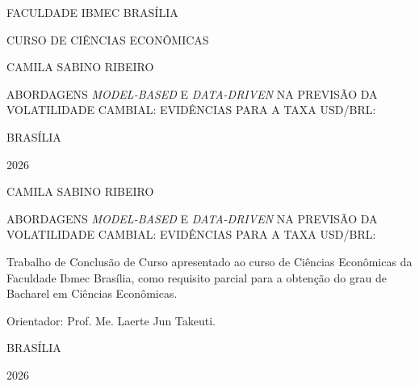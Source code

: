 \documentclass[12pt,a4paper,oneside,openany]{report}
\newcommand{\tccinstituicao}{FACULDADE IBMEC BRASÍLIA}
\newcommand{\tcccurso}{CURSO DE CIÊNCIAS ECONÔMICAS}
\newcommand{\tccautor}{CAMILA SABINO RIBEIRO}
\newcommand{\tcctitulo}{ABORDAGENS \textit{MODEL-BASED} E \textit{DATA-DRIVEN} NA PREVISÃO DA VOLATILIDADE CAMBIAL: EVIDÊNCIAS PARA A TAXA USD/BRL}
\newcommand{\tccsubtitulo}{}            %
\newcommand{\tcclocal}{BRASÍLIA}
\newcommand{\tccano}{2026}
\newcommand{\tccorientador}{Prof. Me. Laerte Jun Takeuti}
\newcommand{\tccnatureza}{Trabalho de Conclusão de Curso apresentado ao curso
de Ciências Econômicas da Faculdade Ibmec Brasília, como requisito parcial para a
obtenção do grau de Bacharel em Ciências Econômicas.}
\newcommand{\tcctitulocompleto}{\tcctitulo\ifx\tccsubtitulo\empty\else: \tccsubtitulo\fi}
\begin{document}

\begin{titlepage}
  \centering\bfseries\singlespacing
  {\tccinstituicao\par}
  \vspace{0.5\baselineskip}
  {\tcccurso\par}
  \vspace{3cm}
  {\tccautor\par}
  \vfill
  {\tcctitulocompleto\par}
  \vfill
  {\tcclocal\par}
  {\tccano\par}
\end{titlepage}

\thispagestyle{empty}
\begin{center}\bfseries\singlespacing
  {\tccautor\par}
  \vspace{4cm}
  {\tcctitulocompleto\par}
\end{center}
\vspace{2cm}
\hfill
\begin{minipage}{0.5\textwidth}
  \singlespacing\normalfont\justifying
  \noindent\tccnatureza\par
  \vspace{\baselineskip}
  \noindent Orientador: \tccorientador.
\end{minipage}
\vfill
\begin{center}\bfseries\singlespacing
  {\tcclocal\par}
  {\tccano\par}
\end{center}
\newpage
\end{document}
